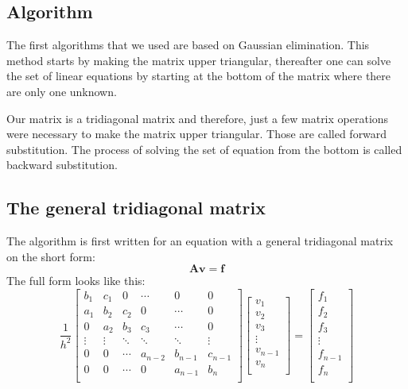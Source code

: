 \subsection{Algorithm}

The first algorithms that we used are based on Gaussian elimination. This method starts by making the matrix upper triangular, thereafter one can solve the set of linear equations by starting at the bottom of the matrix where there are only one unknown. 

Our matrix is a tridiagonal matrix and therefore, just a few matrix operations were necessary to make the matrix upper triangular. Those are called forward substitution. The process of solving the set of equation from the bottom is called backward substitution.

\subsection{The general tridiagonal matrix}
The algorithm is first written for an equation with a general tridiagonal matrix on the short form:
\[
\mathbf{A}\mathbf{v}=\mathbf{f}
\]
The full form looks like this:
\[ \frac{1}{h^2}
    \begin{bmatrix}
    	b_1& c_1& 0 &\cdots & 0 &0 \\
        a_1 & b_2 & c_2 &0 &\cdots &0 \\
        0&a_2 &b_3 & c_3 & \cdots & 0 \\
        \vdots& \vdots & \ddots &\ddots &\ddots & \vdots \\
        0&0 & \cdots &a_{n-2} &b_{n-1}& c_{n-1} \\
        0&0 & \cdots & 0  &a_{n-1} & b_n \\
        \end{bmatrix}
\begin{bmatrix}
	v_1\\
	v_2\\
	v_3\\
	\vdots\\
	v_{n-1}\\
	v_{n}\\
\end{bmatrix}=
\begin{bmatrix}
	f_1\\
	f_2\\
	f_3\\
	\vdots\\
	f_{n-1}\\
	f_{n}\\
\end{bmatrix}
\]

